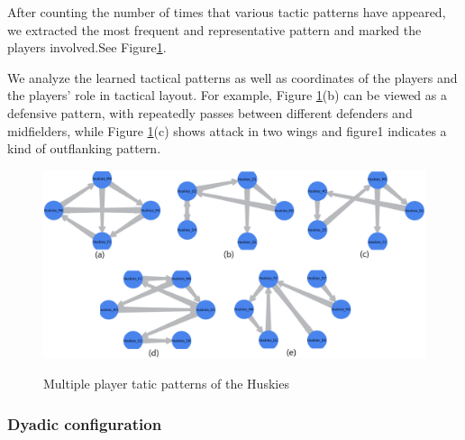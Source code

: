 \documentclass{mcmthesis}
\begin{document}
After counting the number of times that various tactic patterns have appeared, we extracted the most frequent and representative pattern and marked the players involved.See Figure\ref{meso}.

We analyze the learned tactical patterns as well as coordinates of the players and the players' role in tactical layout. For example, Figure \ref{meso}(b) can be viewed as a defensive pattern, with repeatedly passes between different defenders and midfielders, while Figure \ref{meso}(c) shows attack in two wings and figure1 indicates a kind of outflanking pattern.
\begin{figure}[htbp]
  \centering
  \caption{Multiple player tatic patterns of the Huskies}
  \includegraphics[width=15cm]{meso1.png}
  \label{meso}
\end{figure}
\subsubsection{Dyadic configuration}
\end{document}
